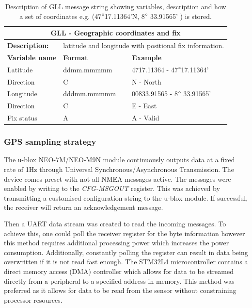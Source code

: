 \begin{table}[H]
	\centering
	\caption{Description of GLL message string showing variables, description and how a set of coordinates e.g. (47$\degree$17.11364'N,  8$\degree$ 33.91565' ) is stored.}
	\setlength{\extrarowheight}{5pt}
	\begin{tabular}{lll}
		\hline
		\hline
		\multicolumn{3}{c}{\textbf{GLL - Geographic coordinates and fix}}\\
		\hline
		\textbf{Description:} & \multicolumn{2}{l}{ latitude and longitude with positional fix information.}\\
		\hline
		\hline
		\textbf{Variable name} & \textbf{Format}& \textbf{Example} \\
		\hline
		Latitude & ddmm.mmmmm & 4717.11364 - 47$\degree$17.11364'\\
		\hline
		Direction  & C & N - North \\
		\hline
		Longitude &dddmm.mmmmm & 00833.91565 - 8$\degree$ 33.91565' \\
		\hline
		Direction & C & E - East \\
		\hline
		Fix status & A & A - Valid\\
		\hline
		\hline
	\end{tabular}
	
	\label{tab:NMEA_GLL}
\end{table}

\subsubsection{GPS sampling strategy}
The u-blox NEO-7M/NEO-M9N module continuously outputs data at a fixed rate of 1Hz \cite{UBLOX_M9N_INTERFACE} through Universal Synchronous/Asynchronous Transmission. The device comes preset with not all NMEA messages active. The messages were enabled by writing to the \textit{CFG-MSGOUT} register. This was achieved by transmitting a customised configuration string to the u-blox module. If successful, the receiver will return an acknowledgement message.\par 
Then a UART data stream was created to read the incoming messages. To achieve this, one could poll the receiver register for the byte information however this method requires additional processing power which increases the power consumption. Additionally, constantly polling the register can result in data being overwritten if it is not read fast enough. The STM32L4 microcontroller contains a direct memory access (DMA) controller \cite{stm32l4ref} which allows for data to be streamed directly from a peripheral to a specified address in memory. This method was preferred as it allows for data to be read from the sensor without constraining processor resources. \par 

